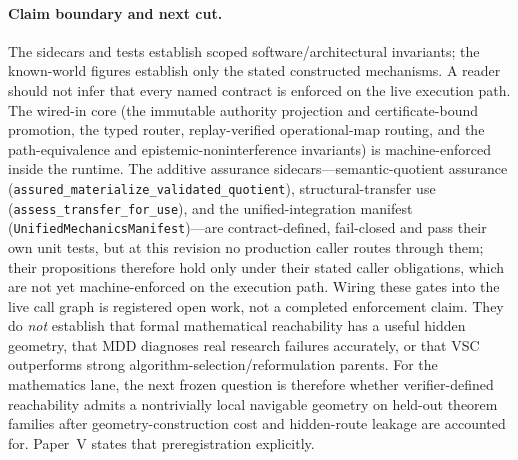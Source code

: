 \paragraph{Claim boundary and next cut.}
The sidecars and tests establish scoped software/architectural invariants; the known-world figures establish only the stated constructed mechanisms. A reader should not infer that every named contract is enforced on the live execution path. The wired-in core (the immutable authority projection and certificate-bound promotion, the typed router, replay-verified operational-map routing, and the path-equivalence and epistemic-noninterference invariants) is machine-enforced inside the runtime. The additive assurance sidecars---semantic-quotient assurance (\texttt{assured\_materialize\_validated\_quotient}), structural-transfer use (\texttt{assess\_transfer\_for\_use}), and the unified-integration manifest (\texttt{UnifiedMechanicsManifest})---are contract-defined, fail-closed and pass their own unit tests, but at this revision no production caller routes through them; their propositions therefore hold only under their stated caller obligations, which are not yet machine-enforced on the execution path. Wiring these gates into the live call graph is registered open work, not a completed enforcement claim. They do \emph{not} establish that formal mathematical reachability has a useful hidden geometry, that MDD diagnoses real research failures accurately, or that VSC outperforms strong algorithm-selection/reformulation parents. For the mathematics lane, the next frozen question is therefore whether verifier-defined reachability admits a nontrivially local navigable geometry on held-out theorem families after geometry-construction cost and hidden-route leakage are accounted for. Paper~V states that preregistration explicitly.
